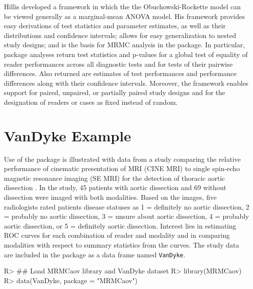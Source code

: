 \documentclass[
]{jss}
\begin{document}
Hillis \citeyearpar{Hillis:2014:MMA} developed a framework in which the
the Obuchowski-Rockette model can be viewed generally as a marginal-mean
ANOVA model. His framework provides easy derivations of test statistics
and parameter estimates, as well as their distributions and confidence
intervals; allows for easy generalization to nested study designs; and
is the basis for MRMC analysis in the package. In particular, package
analyses return test statistics and p-values for a global test of
equality of reader performances across all diagnostic tests and for
tests of their pairwise differences. Also returned are estimates of test
performances and performance differences along with their confidence
intervals. Moreover, the framework enables support for paired, unpaired,
or partially paired study designs and for the designation of readers or
cases as fixed instead of random.

\hypertarget{vandyke-example}{%
\section{VanDyke Example}\label{vandyke-example}}

Use of the  package is illustrated with data from a study
comparing the relative performance of cinematic presentation of MRI
(CINE MRI) to single spin-echo magnetic resonance imaging (SE MRI) for
the detection of thoracic aortic dissection \citep{VanDyke:1993:CMD}. In
the study, 45 patients with aortic dissection and 69 without dissection
were imaged with both modalities. Based on the images, five radiologists
rated patients disease statuses as 1 = definitely no aortic dissection,
2 = probably no aortic dissection, 3 = unsure about aortic dissection, 4
= probably aortic dissection, or 5 = definitely aortic dissection.
Interest lies in estimating ROC curves for each combination of reader
and modality and in comparing modalities with respect to summary
statistics from the curves. The study data are included in the package
as a data frame named \texttt{VanDyke}.

\begin{CodeChunk}
\begin{CodeInput}
R> ## Load MRMCaov library and VanDyke dataset
R> library(MRMCaov)
R> data(VanDyke, package = "MRMCaov")
\end{CodeInput}
\end{CodeChunk}
\end{document}
